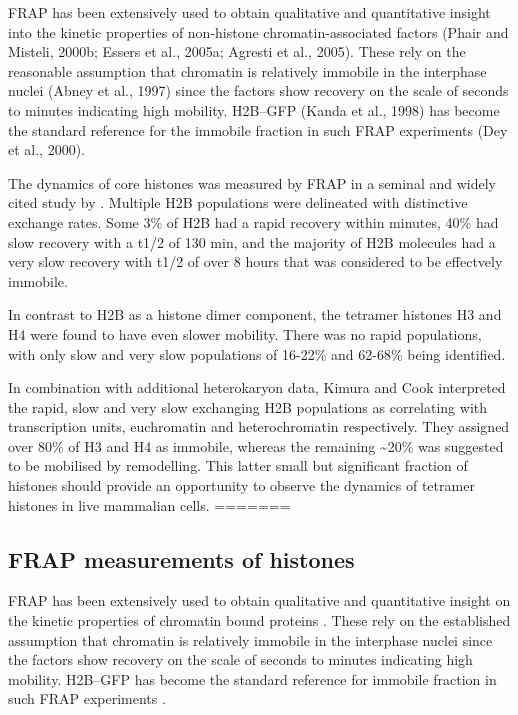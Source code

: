     FRAP has been extensively used to obtain qualitative and quantitative insight 
    into the kinetic properties of non-histone chromatin-associated factors 
    (Phair and Misteli, 2000b; Essers et al., 2005a; Agresti et al., 2005). 
    These rely on the reasonable assumption that chromatin is 
    relatively immobile in the interphase nuclei (Abney et al., 1997)
    since the factors show recovery on the scale of seconds to minutes indicating high mobility.
    H2B–GFP (Kanda et al., 1998) has become the standard reference 
    for the immobile fraction in such FRAP experiments (Dey et al., 2000).

    The dynamics of core histones was measured by FRAP 
    in a seminal and widely cited study by \citet{KimuraCook}.
    Multiple H2B populations were delineated with distinctive exchange rates.
    Some 3\% of H2B had a rapid recovery within minutes, 
    40\% had slow recovery with a t1/2 of 130 min, 
    and the majority of H2B molecules had a very slow recovery with t1/2 of over 8 hours
    that was considered to be effectvely immobile.

    In contrast to H2B as a histone dimer component,
    the tetramer histones H3 and H4 were found to have even slower mobility.
    There was no rapid populations, with only slow and very slow populations 
    of 16-22\% and 62-68\% being identified.
    
    In combination with additional heterokaryon data, Kimura and Cook 
    interpreted the rapid, slow and very slow exchanging H2B populations 
    as correlating with transcription units, euchromatin and heterochromatin respectively.
    They assigned over 80\% of H3 and H4 as immobile, 
    whereas the remaining \textasciitilde20\% was suggested to be mobilised by remodelling.
    This latter small but significant fraction of histones should provide an 
    opportunity to observe the dynamics of tetramer histones in live mammalian cells.
=======
  \subsection{FRAP measurements of histones}

    FRAP has been extensively used to obtain qualitative and
    quantitative insight on the kinetic properties of chromatin bound
    proteins \citep{phair2000high, essers2005nuclear, agresti2005gr}.
    These rely on the established assumption that chromatin is
    relatively immobile in the interphase nuclei
    \citep{abney1997chromatin} since the factors show recovery
    on the scale of seconds to minutes indicating high mobility.
    H2B--GFP \citep{KevinH2BGFP} has become
    the standard reference for immobile fraction in such
    FRAP experiments \citep{dey2000bromodomain}.


